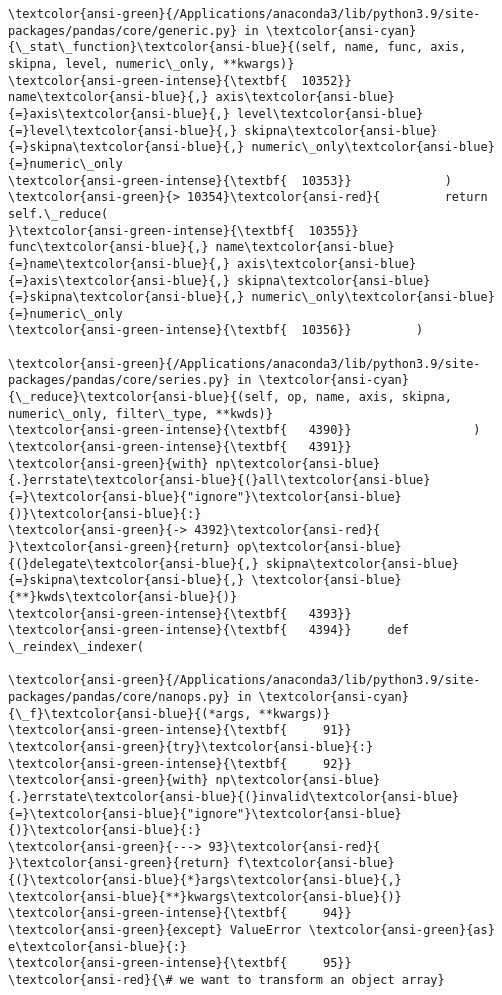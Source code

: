 \documentclass[11pt]{article}
\begin{document}
\begin{Verbatim}[commandchars=\\\{\}, frame=single, framerule=2mm, rulecolor=\color{outerrorbackground}]
\textcolor{ansi-green}{/Applications/anaconda3/lib/python3.9/site-packages/pandas/core/generic.py} in \textcolor{ansi-cyan}{\_stat\_function}\textcolor{ansi-blue}{(self, name, func, axis, skipna, level, numeric\_only, **kwargs)}
\textcolor{ansi-green-intense}{\textbf{  10352}}                 name\textcolor{ansi-blue}{,} axis\textcolor{ansi-blue}{=}axis\textcolor{ansi-blue}{,} level\textcolor{ansi-blue}{=}level\textcolor{ansi-blue}{,} skipna\textcolor{ansi-blue}{=}skipna\textcolor{ansi-blue}{,} numeric\_only\textcolor{ansi-blue}{=}numeric\_only
\textcolor{ansi-green-intense}{\textbf{  10353}}             )
\textcolor{ansi-green}{> 10354}\textcolor{ansi-red}{         return self.\_reduce(
}\textcolor{ansi-green-intense}{\textbf{  10355}}             func\textcolor{ansi-blue}{,} name\textcolor{ansi-blue}{=}name\textcolor{ansi-blue}{,} axis\textcolor{ansi-blue}{=}axis\textcolor{ansi-blue}{,} skipna\textcolor{ansi-blue}{=}skipna\textcolor{ansi-blue}{,} numeric\_only\textcolor{ansi-blue}{=}numeric\_only
\textcolor{ansi-green-intense}{\textbf{  10356}}         )

\textcolor{ansi-green}{/Applications/anaconda3/lib/python3.9/site-packages/pandas/core/series.py} in \textcolor{ansi-cyan}{\_reduce}\textcolor{ansi-blue}{(self, op, name, axis, skipna, numeric\_only, filter\_type, **kwds)}
\textcolor{ansi-green-intense}{\textbf{   4390}}                 )
\textcolor{ansi-green-intense}{\textbf{   4391}}             \textcolor{ansi-green}{with} np\textcolor{ansi-blue}{.}errstate\textcolor{ansi-blue}{(}all\textcolor{ansi-blue}{=}\textcolor{ansi-blue}{"ignore"}\textcolor{ansi-blue}{)}\textcolor{ansi-blue}{:}
\textcolor{ansi-green}{-> 4392}\textcolor{ansi-red}{                 }\textcolor{ansi-green}{return} op\textcolor{ansi-blue}{(}delegate\textcolor{ansi-blue}{,} skipna\textcolor{ansi-blue}{=}skipna\textcolor{ansi-blue}{,} \textcolor{ansi-blue}{**}kwds\textcolor{ansi-blue}{)}
\textcolor{ansi-green-intense}{\textbf{   4393}} 
\textcolor{ansi-green-intense}{\textbf{   4394}}     def \_reindex\_indexer(

\textcolor{ansi-green}{/Applications/anaconda3/lib/python3.9/site-packages/pandas/core/nanops.py} in \textcolor{ansi-cyan}{\_f}\textcolor{ansi-blue}{(*args, **kwargs)}
\textcolor{ansi-green-intense}{\textbf{     91}}             \textcolor{ansi-green}{try}\textcolor{ansi-blue}{:}
\textcolor{ansi-green-intense}{\textbf{     92}}                 \textcolor{ansi-green}{with} np\textcolor{ansi-blue}{.}errstate\textcolor{ansi-blue}{(}invalid\textcolor{ansi-blue}{=}\textcolor{ansi-blue}{"ignore"}\textcolor{ansi-blue}{)}\textcolor{ansi-blue}{:}
\textcolor{ansi-green}{---> 93}\textcolor{ansi-red}{                     }\textcolor{ansi-green}{return} f\textcolor{ansi-blue}{(}\textcolor{ansi-blue}{*}args\textcolor{ansi-blue}{,} \textcolor{ansi-blue}{**}kwargs\textcolor{ansi-blue}{)}
\textcolor{ansi-green-intense}{\textbf{     94}}             \textcolor{ansi-green}{except} ValueError \textcolor{ansi-green}{as} e\textcolor{ansi-blue}{:}
\textcolor{ansi-green-intense}{\textbf{     95}}                 \textcolor{ansi-red}{\# we want to transform an object array}


\end{Verbatim}
\end{document}
